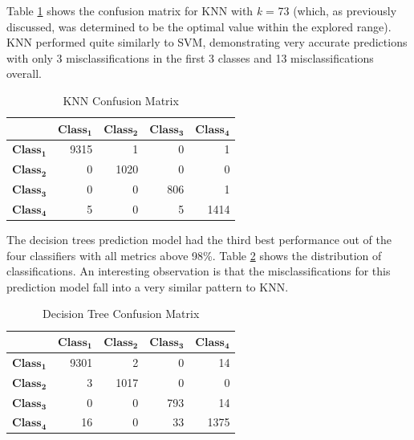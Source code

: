 \documentclass[letterpaper, 10 pt, conference]{ieeeconf}  %
\begin{document}
Table \ref{tab:KNN_CM} shows the confusion matrix for KNN with \textit{k} = 73 (which, as previously discussed, was determined to be the optimal value within the explored range). KNN performed quite similarly to SVM, demonstrating very accurate predictions with only 3 misclassifications in the first 3 classes and 13 misclassifications overall.

\begin{table}[htb]
    \centering
    \begin{tabular}{|c|r|r|r|r|}
        \hline
        & \multicolumn{1}{c|}{$\boldsymbol{Class_1}$} & \multicolumn{1}{c|}{$\boldsymbol{Class_2}$} & \multicolumn{1}{c|}{$\boldsymbol{Class_3}$} & \multicolumn{1}{c|}{$\boldsymbol{Class_4}$} \\
        \hline
        $\boldsymbol{Class_1}$ & 9315 & 1 & 0 & 1 \\
        \hline
        $\boldsymbol{Class_2}$ & 0 & 1020 &  0 & 0 \\
        \hline
        $\boldsymbol{Class_3}$ & 0 & 0 & 806 & 1 \\
        \hline
        $\boldsymbol{Class_4}$ & 5 & 0 & 5 & 1414 \\
        \hline
 
    \end{tabular}
    \caption{KNN Confusion Matrix}
    \label{tab:KNN_CM}
\end{table}

The decision trees prediction model had the third best performance out of the four classifiers with all metrics above 98\%. Table \ref{tab:DT_CM} shows the distribution of classifications. An interesting observation is that the misclassifications for this prediction model fall into a very similar pattern to KNN. 

\begin{table}[htb]
    \centering
    \begin{tabular}{|c|r|r|r|r|}
        \hline
        & \multicolumn{1}{c|}{$\boldsymbol{Class_1}$} & \multicolumn{1}{c|}{$\boldsymbol{Class_2}$} & \multicolumn{1}{c|}{$\boldsymbol{Class_3}$} & \multicolumn{1}{c|}{$\boldsymbol{Class_4}$} \\
        \hline
        $\boldsymbol{Class_1}$ & 9301 & 2 & 0 & 14 \\
        \hline
        $\boldsymbol{Class_2}$ & 3 & 1017 &  0 & 0 \\
        \hline
        $\boldsymbol{Class_3}$ & 0 & 0 & 793 & 14 \\
        \hline
        $\boldsymbol{Class_4}$ & 16 & 0 & 33 & 1375 \\
        \hline
 
    \end{tabular}
    \caption{Decision Tree Confusion Matrix}
    \label{tab:DT_CM}
\end{table}
\end{document}
